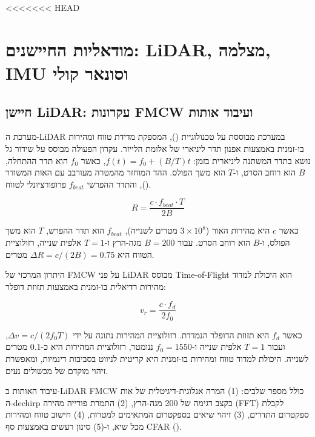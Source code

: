 <<<<<<< HEAD


\section{מודאליות החיישנים: LiDAR, מצלמה, IMU וסונאר קולי}
\label{sec:ch03_sensors}

\subsection{חיישן LiDAR: עקרונות FMCW ועיבוד אותות}
\label{sec:ch03_lidar}

מערכת ה-LiDAR במערכת  מבוססת על טכנולוגיית  (), המספקת מדידת טווח ומהירות בו-זמנית באמצעות אפנון תדר ליניארי של אלומת הלייזר. עקרון הפעולה מבוסס על שידור גל נושא בתדר המשתנה ליניארית בזמן: $f(t) = f_0 + (B/T)t$, כאשר $f_0$ הוא תדר ההתחלה, $B$ הוא רוחב הסרט, ו-$T$ הוא משך הפולס. ההד המוחזר מהמטרה מעורבב עם האות המשודר (), והתדר ההפרשי $f_{beat}$ פרופורציונלי לטווח.

\begin{equation}
R = \frac{c \cdot f_{beat} \cdot T}{2B}
\label{eq:ch03_fmcw_range}
\end{equation}

כאשר $c$ היא מהירות האור ($3 \times 10^8$ מטרים לשנייה), $f_{beat}$ הוא תדר ההפרש, $T$ הוא משך הפולס, ו-$B$ הוא רוחב הסרט. עבור $B = 200$ מגה-הרץ ו-$T = 1$ אלפית שנייה, רזולוציית הטווח היא $\Delta R = c / (2B) = 0.75$ מטרים.

היתרון המרכזי של FMCW על פני LiDAR מבוסס Time-of-Flight הוא היכולת למדוד מהירות רדיאלית בו-זמנית באמצעות תזוזת דופלר:

\begin{equation}
v_r = \frac{c \cdot f_d}{2f_0}
\label{eq:ch03_doppler_velocity}
\end{equation}

כאשר $f_d$ היא תזוזת הדופלר הנמדדת. רזולוציית המהירות נתונה על ידי $\Delta v = c / (2f_0 T)$, ועבור $T = 1$ אלפית שנייה ו-$f_0 = 1550$ ננומטר, רזולוציית המהירות היא כ-0.1 מטרים לשנייה. היכולת למדוד טווח ומהירות בו-זמנית היא קריטית לניווט בסביבות דינמיות, ומאפשרת זיהוי מוקדם של מכשולים נעים.

עיבוד האותות ב-LiDAR FMCW כולל מספר שלבים: (1) המרה אנלוגית-דיגיטלית של אות ה-dechirp בקצב דגימה של 200 מגה-הרץ, (2) התמרת פורייה מהירה (FFT) לקבלת ספקטרום התדרים, (3) זיהוי שיאים בספקטרום המתאימים למטרות, (4) חישוב טווח ומהירות מכל שיא, ו-(5) סינון רעשים באמצעות סף CFAR ().

